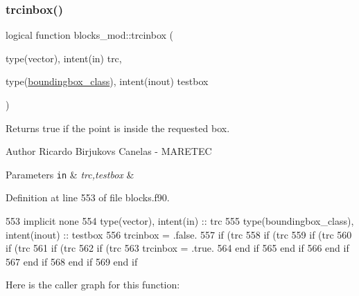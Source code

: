 \mbox{\label{namespaceblocks__mod_ad8d92210b3d4ade090d2a19b97f4c88e}} 
\subsubsection{\texorpdfstring{trcinbox()}{trcinbox()}}
{\footnotesize\ttfamily logical function blocks\+\_\+mod\+::trcinbox (\begin{DoxyParamCaption}\item[{type(vector), intent(in)}]{trc,  }\item[{type(\mbox{\hyperlink{structboundingbox__mod_1_1boundingbox__class}{boundingbox\+\_\+class}}), intent(inout)}]{testbox }\end{DoxyParamCaption})\hspace{0.3cm}{\ttfamily [private]}}



Returns true if the point is inside the requested box. 

\begin{DoxyAuthor}{Author}
Ricardo Birjukovs Canelas -\/ M\+A\+R\+E\+T\+EC 
\end{DoxyAuthor}

\begin{DoxyParams}[1]{Parameters}
\mbox{\tt in}  & {\em trc,testbox} & \\
\hline
\end{DoxyParams}


Definition at line 553 of file blocks.\+f90.


\begin{DoxyCode}
553     \textcolor{keywordtype}{implicit none}
554     \textcolor{keywordtype}{type}(vector), \textcolor{keywordtype}{intent(in)} :: trc
555     \textcolor{keywordtype}{type}(boundingbox\_class), \textcolor{keywordtype}{intent(inout)} :: testbox
556     trcinbox = .false.
557     \textcolor{keywordflow}{if} (trc%
558         \textcolor{keywordflow}{if} (trc%
559             \textcolor{keywordflow}{if} (trc%
560                 \textcolor{keywordflow}{if} (trc%
561                     \textcolor{keywordflow}{if} (trc%
562                         \textcolor{keywordflow}{if} (trc%
563                             trcinbox = .true.
564 \textcolor{keywordflow}{                        end if}
565 \textcolor{keywordflow}{                    end if}
566 \textcolor{keywordflow}{                end if}
567 \textcolor{keywordflow}{            end if}
568 \textcolor{keywordflow}{        end if}
569 \textcolor{keywordflow}{    end if}
\end{DoxyCode}
Here is the caller graph for this function\+:


